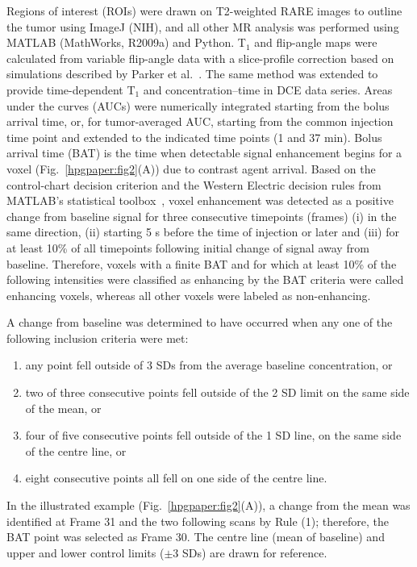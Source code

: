Regions of interest (ROIs) were drawn on T2-weighted RARE images to outline the tumor using ImageJ (NIH), and all other MR analysis was performed using MATLAB (MathWorks, R2009a) and Python.
T$_1$ and flip-angle maps were calculated from variable flip-angle data with a slice-profile correction based on simulations described by Parker et al.~\cite{Parker:2001wj}.
The same method was extended to provide time-dependent T$_1$ and concentration–time in DCE data series.
Areas under the curves (AUCs) were numerically integrated starting from the bolus arrival time, or, for tumor-averaged AUC, starting from the common injection time point and extended to the indicated time points (1 and 37 min).
Bolus arrival time (BAT) is the time when detectable signal enhancement begins for a voxel (Fig.~\ref{hpgpaper:fig2}(A)) due to contrast agent arrival.
Based on the control-chart decision criterion and the Western Electric decision rules from MATLAB’s statistical toolbox~\cite{Shewhart:1931tq}, voxel enhancement was detected as a positive change from baseline signal for three consecutive timepoints (frames) (i) in the same direction, (ii) starting 5 s before the time of injection or later and (iii) for at least 10\% of all timepoints following initial change of signal away from baseline.
Therefore, voxels with a finite BAT and for which at least 10\% of the following intensities were classified as enhancing by the BAT criteria were called enhancing voxels, whereas all other voxels were labeled as non-enhancing.

A change from baseline was determined to have occurred
when any one of the following inclusion criteria were met:

\begin{enumerate}
	\item any point fell outside of 3 SDs from the average baseline concentration, or
	\item two of three consecutive points fell outside of the 2 SD limit on the same side of the mean, or
	\item four of five consecutive points fell outside of the 1 SD line, on the same side of the centre line, or
	\item eight consecutive points all fell on one side of the centre line.
\end{enumerate}

In the illustrated example (Fig.~\ref{hpgpaper:fig2}(A)), a change from the mean was identified at Frame 31 and the two following scans by Rule (1); therefore, the BAT point was selected as Frame 30.
The centre line (mean of baseline) and upper and lower control limits ($\pm$3 SDs) are drawn for reference.

